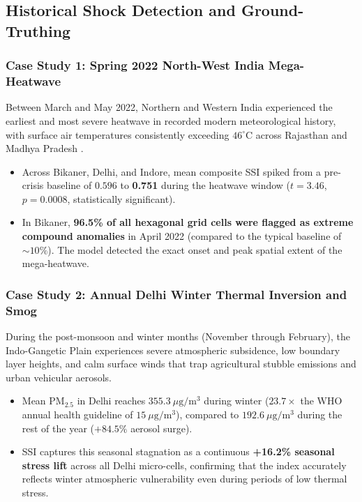 \subsection{Historical Shock Detection and Ground-Truthing}

\subsubsection{Case Study 1: Spring 2022 North-West India Mega-Heatwave}
Between March and May 2022, Northern and Western India experienced the earliest and most severe heatwave in recorded modern meteorological history, with surface air temperatures consistently exceeding $46^\circ\text{C}$ across Rajasthan and Madhya Pradesh \citep{imd2022heatwave}. 
\begin{itemize}
    \item Across Bikaner, Delhi, and Indore, mean composite SSI spiked from a pre-crisis baseline of $0.596$ to \textbf{0.751} during the heatwave window ($t = 3.46$, $p = 0.0008$, statistically significant).
    \item In Bikaner, \textbf{96.5\% of all hexagonal grid cells were flagged as extreme compound anomalies} in April 2022 (compared to the typical baseline of $\sim 10\%$). The model detected the exact onset and peak spatial extent of the mega-heatwave.
\end{itemize}

\subsubsection{Case Study 2: Annual Delhi Winter Thermal Inversion and Smog}
During the post-monsoon and winter months (November through February), the Indo-Gangetic Plain experiences severe atmospheric subsidence, low boundary layer heights, and calm surface winds that trap agricultural stubble emissions and urban vehicular aerosols.
\begin{itemize}
    \item Mean $\text{PM}_{2.5}$ in Delhi reaches $355.3\ \mu\text{g}/\text{m}^3$ during winter ($23.7\times$ the WHO annual health guideline of $15\ \mu\text{g}/\text{m}^3$), compared to $192.6\ \mu\text{g}/\text{m}^3$ during the rest of the year ($+84.5\%$ aerosol surge).
    \item SSI captures this seasonal stagnation as a continuous \textbf{+16.2\% seasonal stress lift} across all Delhi micro-cells, confirming that the index accurately reflects winter atmospheric vulnerability even during periods of low thermal stress.
\end{itemize}

